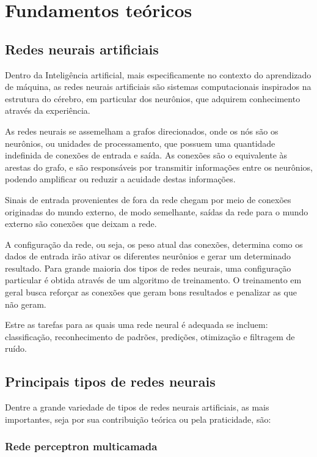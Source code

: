 \chapter{Fundamentos teóricos}

\section{Redes neurais artificiais}

Dentro da Inteligência artificial, mais especificamente no contexto do
aprendizado de máquina, as redes neurais artificiais são sistemas computacionais
inspirados na estrutura do cérebro, em particular dos neurônios, que adquirem
conhecimento através da experiência.

As redes neurais se assemelham a grafos direcionados, onde os nós são os
neurônios, ou unidades de processamento, que possuem uma quantidade indefinida
de conexões de entrada e saída. As conexões são o equivalente às arestas do
grafo, e são responsáveis por transmitir informações entre os neurônios, podendo
amplificar ou reduzir a acuidade destas informações.

Sinais de entrada provenientes de fora da rede chegam por meio de conexões
originadas do mundo externo, de modo semelhante, saídas da rede para o mundo
externo são conexões que deixam a rede.

A configuração da rede, ou seja, os peso atual das conexões, determina como os
dados de entrada irão ativar os diferentes neurônios e gerar um determinado
resultado. Para grande maioria dos tipos de redes neurais, uma configuração
particular é obtida através de um algoritmo de treinamento. O treinamento em
geral busca reforçar as conexões que geram bons resultados e penalizar as que
não geram.

Estre as tarefas para as quais uma rede neural é adequada se
incluem: classificação, reconhecimento de padrões, predições, otimização
e filtragem de ruído.

\section{Principais tipos de redes neurais}

Dentre a grande variedade de tipos de redes neurais artificiais, as mais
importantes, seja por sua contribuição teórica ou pela praticidade, são:

\subsection{Rede perceptron multicamada}


